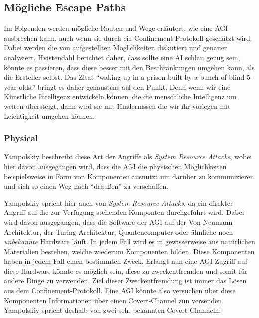         \subsection{Mögliche Escape Paths}
        Im Folgenden werden mögliche Routen und Wege erläutert, wie eine AGI ausbrechen kann, auch wenn sie durch ein
        Confinement-Protokoll geschützt wird. Dabei werden die von \citep{yampolskiy2012leakproofing} aufgestellten
        Möglichkeiten diskutiert und genauer analysiert. Hvistendahl berichtet daher, dass sollte eine AI schlau genug
        sein, könnte es passieren, dass diese besser mit den Beschränkungen umgehen kann, als die Ersteller selbst.
        \cite{hvistendahl_2019} Das Zitat ``waking up in a prison built by a bunch of blind 5-year-olds.'' bringt es
        daher genaustens auf den Punkt. Denn wenn wir eine Künstliche Intelligenz entwickeln können, die die menschliche
        Intelligenz um weiten übersteigt, dann wird sie mit Hindernissen die wir ihr vorlegen mit Leichtigkeit umgehen
        können.

        \subsubsection{Physical}
        Yampolskiy beschreibt diese Art der Angriffe als \textit{System Resource Attacks}, wobei hier davon ausgegangen
        wird, dass die AGI die physischen Möglichkeiten beispielsweise in Form von Komponenten ausnutzt um darüber zu
        kommunizieren und sich so einen Weg nach ``draußen'' zu verschaffen.\cite{yampolskiy2012leakproofing}

        Yampolskiy spricht hier auch von \textit{System Resource Attacks}, da ein direkter Angriff auf die zur Verfügung
        stehenden Komponten durchgeführt wird. Dabei wird davon ausgegangen, dass die Software der AGI auf der
        Von-Neumann-Architektur, der Turing-Architektur, Quantencomputer oder ähnliche noch \textit{unbekannte} Hardware
        läuft. In jedem Fall wird es in gewisserweise aus natürlichen Materialien bestehen, welche wiederum Komponenten
        bilden. Diese Komponenten haben in jedem Fall einen bestimmten Zweck. Erlangt nun eine AGI Zugriff auf diese
        Hardware könnte es möglich sein, diese zu zweckentfremden und somit für andere Dinge zu verwenden.\cite[s. 199]{yampolskiy2012leakproofing}
        Ziel dieser Zweckentfremdung ist immer das Lösen aus dem Confinement-Protokoll. Eine AGI könnte also versuchen
        über diese Komponenten Informationen über einen Covert-Channel zun versenden. Yampolskiy spricht deshalb von
        zwei sehr bekannten Covert-Channeln:

